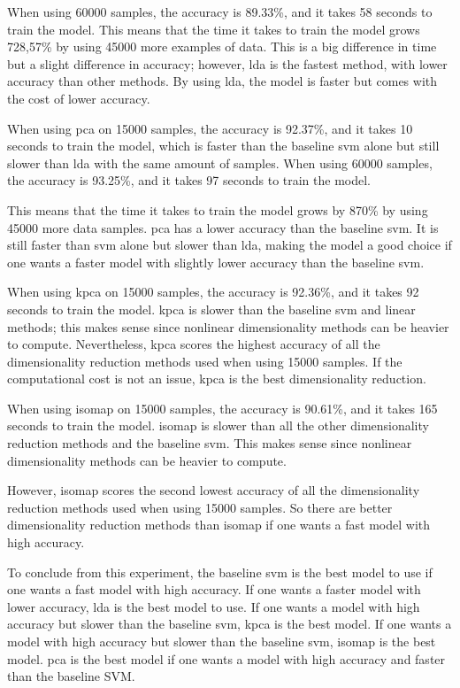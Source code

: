 When using 60000 samples, the accuracy is 89.33\%, and it takes 58 seconds to train the model. This means that the time it takes to train the model grows 728,57\% by using 45000 more examples of data. This is a big difference in time but a slight difference in accuracy; however, \gls{lda} is the fastest method, with lower accuracy than other methods. By using \gls{lda}, the model is faster but comes with the cost of lower accuracy.

When using \gls{pca} on 15000 samples, the accuracy is 92.37\%, and it takes 10 seconds to train the model, which is faster than the baseline \gls{svm} alone but still slower than \gls{lda} with the same amount of samples. When using 60000 samples, the accuracy is 93.25\%, and it takes 97 seconds to train the model.

This means that the time it takes to train the model grows by 870\% by using 45000 more data samples. \gls{pca} has a lower accuracy than the baseline \gls{svm}. It is still faster than \gls{svm} alone but slower than \gls{lda}, making the model a good choice if one wants a faster model with slightly lower accuracy than the baseline \gls{svm}.

When using \gls{kpca} on 15000 samples, the accuracy is 92.36\%, and it takes 92 seconds to train the model. \gls{kpca} is slower than the baseline \gls{svm} and linear methods; this makes sense since nonlinear dimensionality methods can be heavier to compute. Nevertheless, \gls{kpca} scores the highest accuracy of all the dimensionality reduction methods used when using 15000 samples. If the computational cost is not an issue, \gls{kpca} is the best dimensionality reduction.

When using \gls{isomap} on 15000 samples, the accuracy is 90.61\%, and it takes 165 seconds to train the model. \gls{isomap} is slower than all the other dimensionality reduction methods and the baseline \gls{svm}. This makes sense since nonlinear dimensionality methods can be heavier to compute.

However, \gls{isomap} scores the second lowest accuracy of all the dimensionality reduction methods used when using 15000 samples. So there are better dimensionality reduction methods than \gls{isomap} if one wants a fast model with high accuracy.

To conclude from this experiment, the baseline \gls{svm} is the best model to use if one wants a fast model with high accuracy. If one wants a faster model with lower accuracy, \gls{lda} is the best model to use. If one wants a model with high accuracy but slower than the baseline \gls{svm}, \gls{kpca} is the best model. If one wants a model with high accuracy but slower than the baseline \gls{svm}, \gls{isomap} is the best model. \gls{pca} is the best model if one wants a model with high accuracy and faster than the baseline SVM.

